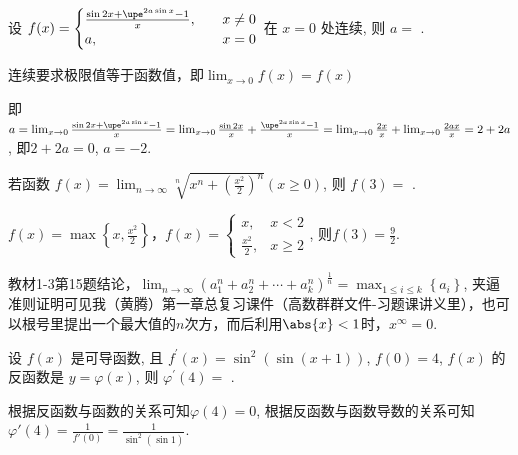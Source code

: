 \documentclass{USTBExam}
\begin{document}
\begin{problem}
  设 $f(x)=
    \begin{cases}
      \frac{\sin 2 x+\upe^{2 a \sin x}-1}{x}, & \quad x \neq 0 \\
      a,                                      & \quad x=0
    \end{cases}
  $ 在 $x=0$ 处连续, 则 $a=$
  \fillin[$-2$].
\end{problem}

\begin{analysis}
  连续要求极限值等于函数值，即$\lim _{x \to 0} f(x) = f(x)$

  即$a = \lim _{x \to 0} \frac{\sin 2 x+\upe^{2 a \sin x}-1}{x} = \lim _{x \to 0} \frac{\sin 2 x}{x} + \frac{\upe^{2 a \sin x}-1}{x} = \lim _{x \to 0} \frac{2x}{x} + \lim _{x \to 0} \frac{2 a x}{x} = 2+2a$, 即$2+2a=0$, $a=-2$.
\end{analysis}

\begin{problem}
  若函数 $f(x)=\lim _{n \to \infty} \sqrt[n]{x^{n}+\left(\frac{x^{2}}{2}\right)^{n}}(x \geq 0)$, 则 $f(3)=$
  \fillin[$\frac{9}{2}$].
\end{problem}

\begin{analysis}
  $f(x)=\max\left\{ x, \frac{x^2}{2} \right\}$，$f(x) =
    \begin{cases}
      x, & x<2 \\ \frac{x^2}{2}, & x \ge 2
    \end{cases}
  $, 则$f(3) = \frac{9}{2}$.

  \faMortarBoard 教材1-3第15题结论，$\lim_{n\to \infty} \left( a_{1}^{n}+a_{2}^{n}+\cdots +a_{k}^{n} \right) ^{\tfrac{1}{n}}=\max_{1\leqslant i\leqslant k} \left\{ a_i \right\}$, 夹逼准则证明可见我（黄腾）第一章总复习课件（高数群群文件-习题课讲义里），也可以根号里提出一个最大值的$n$次方，而后利用$\abs{x}<1$时，$x^\infty=0$.
\end{analysis}

\begin{problem}
  设 $f(x)$ 是可导函数, 且 $f^{\prime}(x)=\sin ^{2}(\sin (x+1))$, $f(0)=4$, $f(x)$ 的反函数是 $y=\varphi(x)$, 则 $\varphi^{\prime}(4)=$
  .
\end{problem}

\begin{analysis}
  根据反函数与函数的关系可知$\varphi(4) = 0$, 根据反函数与函数导数的关系可知$\varphi'(4) = \frac{1}{f'(0)} = \frac{1}{\sin^2 (\sin 1)}$.
\end{analysis}
\end{document}
